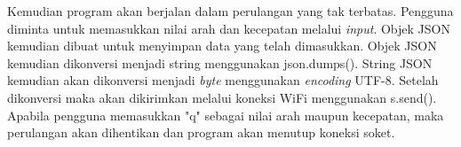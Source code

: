 Kemudian program akan berjalan dalam perulangan yang tak terbatas. Pengguna diminta untuk memasukkan nilai arah dan kecepatan melalui \emph{input}. Objek JSON kemudian dibuat untuk menyimpan data yang telah dimasukkan. Objek JSON kemudian dikonversi menjadi string menggunakan json.dumps(). String JSON kemudian akan dikonversi menjadi \emph{byte} menggunakan \emph{encoding} UTF-8. Setelah dikonversi maka akan dikirimkan melalui koneksi WiFi menggunakan s.send(). Apabila pengguna memasukkan "q" sebagai nilai arah maupun kecepatan, maka perulangan akan dihentikan dan program akan menutup koneksi soket.